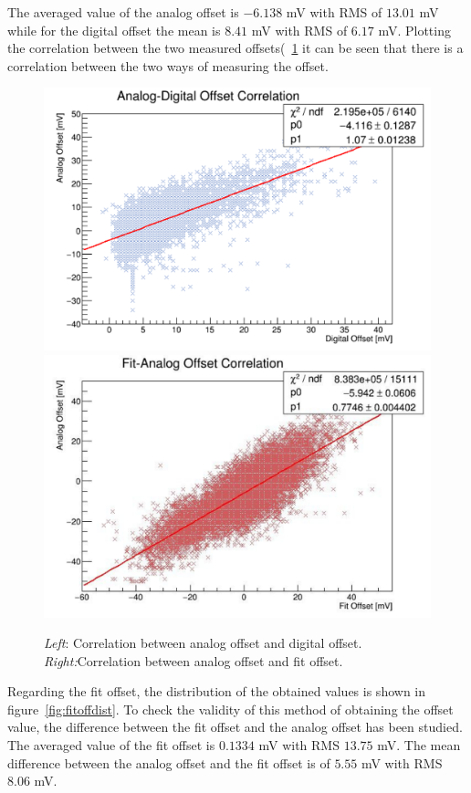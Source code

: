 \documentclass[main.tex]{subfiles}
\begin{document}
The averaged value of the analog offset is $-6.138 $ mV with RMS of $13.01 $ mV while for the digital offset the mean is $8.41$ mV with RMS of $6.17 $ mV. Plotting the correlation between the two measured offsets(~\ref{fig:offsetcor} it can be seen that there is a correlation between the two ways of measuring the offset.
\begin{figure}[h]
  \centering
  \includegraphics[width=\textwidth]{./Pictures/offsetscor.pdf}
  \endminipage
  \includegraphics[width=\textwidth]{./Pictures/fitanalogcor.pdf}
  \endminipage
  \caption{\textit{Left}: Correlation between analog offset and digital offset. \textit{Right:}Correlation between analog offset and fit offset.}
  \label{fig:offsetcor}
\end{figure}
Regarding the fit offset, the distribution of the obtained values is shown in figure~\ref{fig:fitoffdist}. To check the validity of this method of obtaining the offset value, the difference between the fit offset and the analog offset has been studied. The averaged value of the fit offset is $0.1334$ mV  with RMS $13.75$ mV. The mean difference between the analog offset and the fit offset is of $5.55$ mV with RMS $8.06$ mV.
\end{document}
